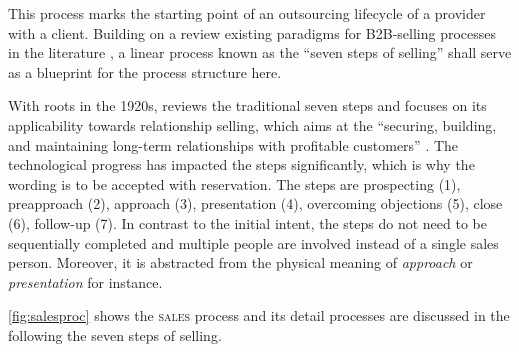 	This process marks the starting point of an outsourcing lifecycle of a provider with a client. Building on a review existing paradigms for B2B-selling processes in the literature \citep{_ge_2011}, a linear process known as the  \enquote{seven steps of selling} shall serve as a blueprint for the process structure here. 
	
	With roots in the 1920s, \cite{Moncrief_2005} reviews the traditional seven steps and focuses on its applicability towards relationship selling, which aims at the \enquote{securing, building, and maintaining long-term relationships with profitable customers} \citep[]{Moncrief_2005}. The technological progress has impacted the steps significantly, which is why the wording is to be accepted with reservation. The steps are prospecting (1), preapproach (2), approach (3), presentation (4), overcoming objections (5), close (6), follow-up (7). In contrast to the initial intent, the steps do not need to be sequentially completed and multiple people are involved instead of a single sales person. Moreover, it is abstracted from the physical meaning of \textit{approach} or \textit{presentation} for instance.
	
	\Fig \ref{fig:salesproc} shows the \textsc{sales} process and its detail processes are discussed in the following \wrt the seven steps of selling. 
	
